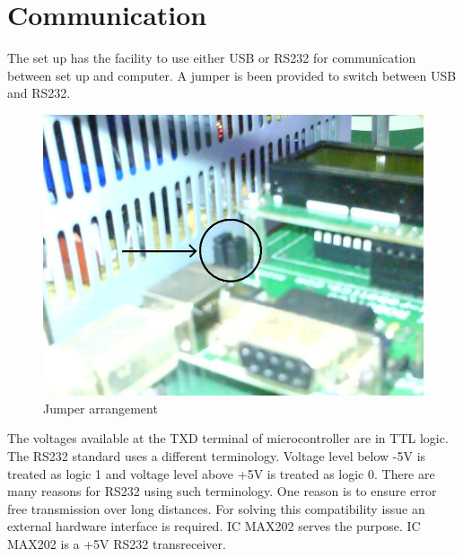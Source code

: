 \documentclass[12pt]{report}
\begin{document}
\section{Communication}
The set up has the facility to use either USB or RS232 for communication between set up and computer. A jumper is been provided to switch between USB and RS232.
\begin{figure}
\centering
\includegraphics[width=0.5\linewidth]{c.jpg}
\caption{Jumper arrangement}
\end{figure}
The voltages available at the TXD terminal of microcontroller are in TTL logic. The RS232 standard uses a different terminology. Voltage level below -5V is treated as logic 1 and voltage level above +5V is treated as logic 0. There are many reasons for RS232 using such terminology. One reason is to ensure error free transmission over long distances. For solving this compatibility issue an external hardware interface is required. IC MAX202 serves the purpose. IC MAX202 is a +5V RS232 transreceiver.
\end{document}

